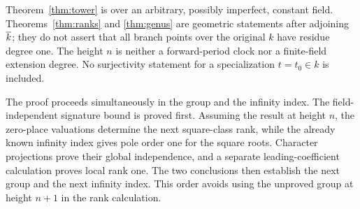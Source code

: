 Theorem~\ref{thm:tower} is over an arbitrary, possibly imperfect,
constant field. Theorems~\ref{thm:ranks} and \ref{thm:genus} are
geometric statements after adjoining $\overline{k}$; they do not assert that
all branch points over the original $k$ have residue degree one.
The height $n$ is neither a forward-period clock nor a finite-field
extension degree. No surjectivity statement for a specialization
$t=t_0\in k$ is included.

The proof proceeds simultaneously in the group and the infinity
index. The field-independent signature bound is proved first. Assuming
the result at height $n$, the zero-place valuations determine the next
square-class rank, while the already known infinity index gives pole
order one for the square roots. Character projections prove their
global independence, and a separate leading-coefficient calculation
proves local rank one. The two conclusions then establish the next
group and the next infinity index. This order avoids using the
unproved group at height $n+1$ in the rank calculation.
